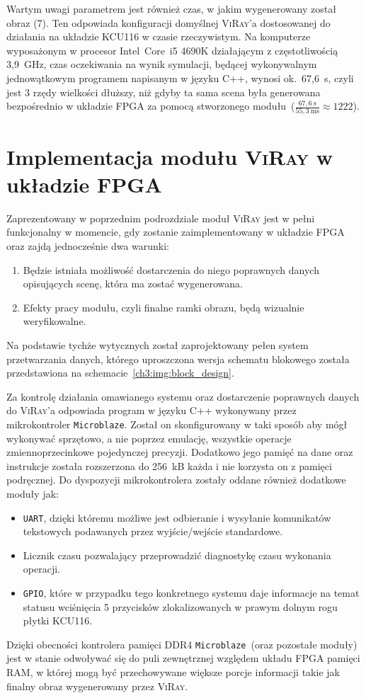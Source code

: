 Wartym uwagi parametrem jest również czas, w jakim wygenerowany został obraz (7). Ten odpowiada konfiguracji domyślnej \textsc{ViRay}'a dostosowanej do działania na układzie KCU116 w czasie rzeczywistym. Na komputerze wyposażonym w procesor Intel~Core~i5 4690K działającym z częstotliwością 3,9~GHz, czas oczekiwania na wynik symulacji, będącej wykonywalnym jednowątkowym programem napisanym w języku C++, wynosi ok.~67,6~s, czyli jest 3 rzędy wielkości dłuższy, niż gdyby ta sama scena była generowana bezpośrednio w układzie FPGA za pomocą stworzonego modułu~($\frac{67,6~\mathrm{s}}{55,3~\mathrm{ms}}\approx 1222$). 







\section{Implementacja modułu \textsc{ViRay} w układzie FPGA}
Zaprezentowany w poprzednim podrozdziale moduł \textsc{ViRay} jest w pełni funkcjonalny w momencie, gdy zostanie zaimplementowany w układzie FPGA oraz zajdą jednocześnie dwa warunki:
\begin{enumerate}
\item Będzie istniała możliwość dostarczenia do niego poprawnych danych opisujących scenę, która ma zostać wygenerowana.
\item Efekty pracy modułu, czyli finalne ramki obrazu, będą wizualnie weryfikowalne.
\end{enumerate}
Na podstawie tychże wytycznych został zaprojektowany pełen system przetwarzania danych, którego uproszczona wersja schematu blokowego została przedstawiona na schemacie~\ref{ch3:img:block_design}.

Za kontrolę działania omawianego systemu oraz dostarczenie poprawnych danych do \textsc{ViRay}'a odpowiada program w języku C++ wykonywany przez mikrokontroler \texttt{Microblaze}. Został on skonfigurowany w taki sposób aby mógł wykonywać sprzętowo, a nie poprzez emulację, wszystkie operacje zmiennoprzecinkowe pojedynczej precyzji. Dodatkowo jego pamięć na dane oraz instrukcje została rozszerzona do 256~kB każda i nie korzysta on z pamięci podręcznej. Do dyspozycji mikrokontrolera zostały oddane również dodatkowe moduły jak:
\begin{itemize}
\item \texttt{UART}, dzięki któremu możliwe jest odbieranie i wysyłanie komunikatów tekstowych podawanych przez wyjście/wejście standardowe.
\item Licznik czasu pozwalający przeprowadzić diagnostykę czasu wykonania operacji.
\item \texttt{GPIO}, które w przypadku tego konkretnego systemu daje informacje na temat statusu wciśnięcia 5 przycisków zlokalizowanych w prawym dolnym rogu płytki KCU116.
\end{itemize}
Dzięki obecności kontrolera pamięci DDR4 \texttt{Microblaze}~(oraz pozostałe moduły) jest w stanie odwoływać się do puli zewnętrznej względem układu FPGA pamięci RAM, w której mogą być przechowywane większe porcje informacji takie jak finalny obraz wygenerowany przez \textsc{ViRay}.

